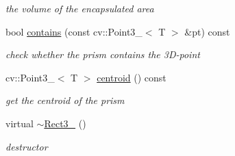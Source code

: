 \begin{DoxyCompactItemize}
\begin{DoxyCompactList}\small\item\em the volume of the encapsulated area \end{DoxyCompactList}\item 
bool \hyperlink{classRect3___ad9928349a9a8bca8f98a1bf1cab676e9}{contains} (const cv\+::\+Point3\+\_\+$<$ T $>$ \&pt) const 
\begin{DoxyCompactList}\small\item\em check whether the prism contains the 3\+D-\/point \end{DoxyCompactList}\item 
cv\+::\+Point3\+\_\+$<$ T $>$ \hyperlink{classRect3___addafb9e6380c9a3ffd4f394d311c59b6}{centroid} () const 
\begin{DoxyCompactList}\small\item\em get the centroid of the prism \end{DoxyCompactList}\item 
virtual \hyperlink{classRect3___a297683142c5197991bfaabdb2305a37c}{$\sim$\+Rect3\+\_\+} ()
\begin{DoxyCompactList}\small\item\em destructor \end{DoxyCompactList}\end{DoxyCompactItemize}
